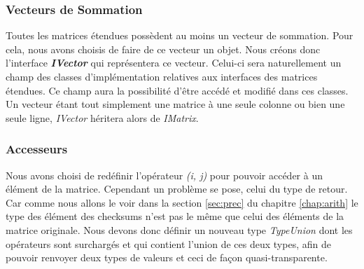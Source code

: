 \documentclass[a4paper, 10pt]{report}
\begin{document}
\subsubsection{Vecteurs de Sommation}
Toutes les matrices étendues possèdent au moins un vecteur de sommation. Pour cela, nous avons choisis de faire de 
ce vecteur un objet. Nous créons donc l’interface \textbf{\textit {IVector}} qui représentera ce vecteur. Celui-ci sera 
naturellement un champ des classes d’implémentation relatives aux interfaces des matrices étendues. Ce champ aura la 
possibilité d’être accédé et modifié dans ces classes. Un vecteur étant tout simplement une matrice à une seule colonne 
ou bien une seule ligne, \textit{IVector} héritera alors de \textit{IMatrix}.

\subsubsection{Accesseurs}
Nous avons choisi de redéfinir l'opérateur \textit{(i, j)} pour pouvoir accéder à un élément de la matrice.
Cependant un problème se pose, celui du type de retour.
Car comme nous allons le voir dans la section \ref{sec:prec} du chapitre \ref{chap:arith} le type des élément des checksums n'est pas le
m\^eme que celui des éléments de la matrice originale.
Nous devons donc définir un nouveau type \textit{TypeUnion} dont les opérateurs sont surchargés et qui contient
l'union de ces deux types, afin de pouvoir renvoyer deux types de valeurs et ceci de façon quasi-transparente.
\end{document}
